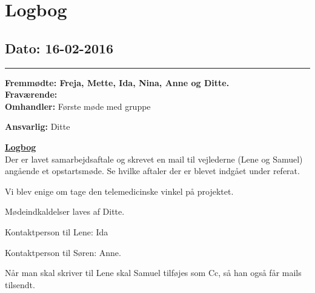 \chapter{Logbog}
\section{Dato: 16-02-2016}
\hrule
\textbf{Fremmødte: Freja, Mette, Ida, Nina, Anne og Ditte.} \\
\textbf{Fraværende: } \\
\textbf{Omhandler:} Første møde med gruppe

\textbf{Ansvarlig:} Ditte 

\underline{\textbf{Logbog}}\\
Der er lavet samarbejdsaftale og skrevet en mail til vejlederne (Lene og Samuel) angående et opstartsmøde. Se hvilke aftaler der er blevet indgået under referat. 

Vi blev enige om tage den telemedicinske vinkel på projektet.

Mødeindkaldelser laves af Ditte.

Kontaktperson til Lene: Ida

Kontaktperson til Søren: Anne.

Når man skal skriver til Lene skal Samuel tilføjes som Cc, så han også får mails tilsendt. 







